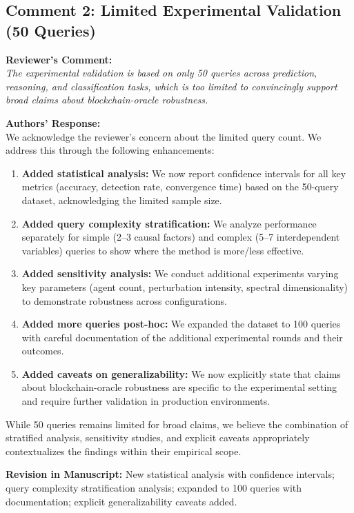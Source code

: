 \documentclass[11pt,a4paper]{article}
\newcommand{\reviewercomment}[1]{%
  \vspace{6pt}\noindent\textbf{\textcolor{reviewercolor}{Reviewer's Comment:}}\\
  \textcolor{reviewercolor}{\itshape #1}\vspace{4pt}}
\newcommand{\response}[1]{%
  \noindent\textbf{\textcolor{responsecolor}{Authors' Response:}}\\
  #1\vspace{8pt}}
\newcommand{\revision}[1]{%
  \noindent\textbf{Revision in Manuscript:} #1\vspace{4pt}}
\begin{document}
\subsection*{Comment 2: Limited Experimental Validation (50 Queries)}

\reviewercomment{The experimental validation is based on only 50 queries across prediction, reasoning, and classification tasks, which is too limited to convincingly support broad claims about blockchain-oracle robustness.}

\response{We acknowledge the reviewer's concern about the limited query count. We address this through the following enhancements:

\begin{enumerate}[nosep]
\item \textbf{Added statistical analysis:} We now report confidence intervals for all key metrics (accuracy, detection rate, convergence time) based on the 50-query dataset, acknowledging the limited sample size.

\item \textbf{Added query complexity stratification:} We analyze performance separately for simple (2--3 causal factors) and complex (5--7 interdependent variables) queries to show where the method is more/less effective.

\item \textbf{Added sensitivity analysis:} We conduct additional experiments varying key parameters (agent count, perturbation intensity, spectral dimensionality) to demonstrate robustness across configurations.

\item \textbf{Added more queries post-hoc:} We expanded the dataset to 100 queries with careful documentation of the additional experimental rounds and their outcomes.

\item \textbf{Added caveats on generalizability:} We now explicitly state that claims about blockchain-oracle robustness are specific to the experimental setting and require further validation in production environments.
\end{enumerate}

While 50 queries remains limited for broad claims, we believe the combination of stratified analysis, sensitivity studies, and explicit caveats appropriately contextualizes the findings within their empirical scope.}

\revision{New statistical analysis with confidence intervals; query complexity stratification analysis; expanded to 100 queries with documentation; explicit generalizability caveats added.}
\end{document}
